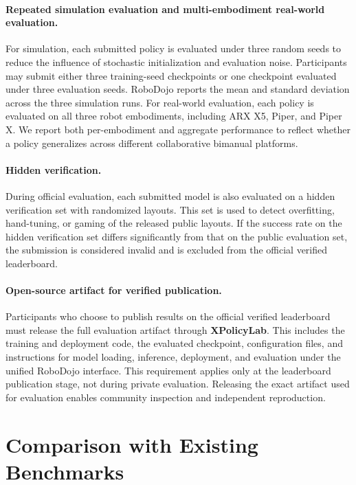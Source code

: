 \paragraph{Repeated simulation evaluation and multi-embodiment real-world evaluation.}
For simulation, each submitted policy is evaluated under three random seeds to reduce the influence of stochastic initialization and evaluation noise. Participants may submit either three training-seed checkpoints or one checkpoint evaluated under three evaluation seeds. RoboDojo reports the mean and standard deviation across the three simulation runs. For real-world evaluation, each policy is evaluated on all three robot embodiments, including ARX X5, Piper, and Piper X. We report both per-embodiment and aggregate performance to reflect whether a policy generalizes across different collaborative bimanual platforms.

\paragraph{Hidden verification.}
During official evaluation, each submitted model is also evaluated on a hidden verification set with randomized layouts. This set is used to detect overfitting, hand-tuning, or gaming of the released public layouts. If the success rate on the hidden verification set differs significantly from that on the public evaluation set, the submission is considered invalid and is excluded from the official verified leaderboard.

\paragraph{Open-source artifact for verified publication.}
Participants who choose to publish results on the official verified leaderboard must release the full evaluation artifact through \textbf{XPolicyLab}. This includes the training and deployment code, the evaluated checkpoint, configuration files, and instructions for model loading, inference, deployment, and evaluation under the unified RoboDojo interface. This requirement applies only at the leaderboard publication stage, not during private evaluation. Releasing the exact artifact used for evaluation enables community inspection and independent reproduction.

\section{Comparison with Existing Benchmarks} \label{sec:benchmark_comparison}

